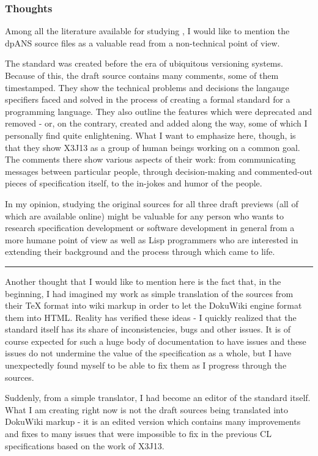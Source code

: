 \subsubsection{Thoughts}

Among all the literature available for studying \cl{}, I would like to mention the dpANS source files as a valuable read from a non-technical point of view.

The standard was created before the era of ubiquitous versioning systems. Because of this, the draft source contains many comments, some of them timestamped. They show the technical problems and decisions the langauge specifiers faced and solved in the process of creating a formal standard for a programming language. They also outline the features which were deprecated and removed - or, on the contrary, created and added along the way, some of which I personally find quite enlightening. What I want to emphasize here, though, is that they show X3J13 as a group of human beings working on a common goal. The comments there show various aspects of their work: from communicating messages between particular people, through decision-making and commented-out pieces of specification itself, to the in-jokes and humor of the people.

In my opinion, studying the original sources for all three draft previews (all of which are available online) might be valuable for any person who wants to research specification development or software development in general from a more humane point of view as well as Lisp programmers who are interested in extending their background and the process through which \cl{} came to life.

\rule{\linewidth}{0.5pt}

Another thought that I would like to mention here is the fact that, in the beginning, I had imagined my work as simple translation of the sources from their \TeX{} format into wiki markup in order to let the DokuWiki engine format them into HTML. Reality has verified these ideas - I quickly realized that the standard itself has its share of inconsistencies, bugs and other issues. It is of course expected for such a huge body of documentation to have issues and these issues do not undermine the value of the specification as a whole, but I have unexpectedly found myself to be able to fix them as I progress through the sources.

Suddenly, from a simple translator, I had become an editor of the \cl{} standard itself. What I am creating right now is not the draft sources being translated into DokuWiki markup - it is an edited version which contains many improvements and fixes to many issues that were impossible to fix in the previous CL specifications based on the work of X3J13.


